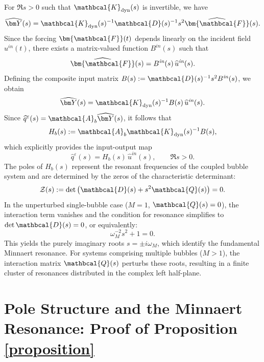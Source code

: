 \documentclass[11pt,a4paper]{article}
\numberwithin{equation}{section}
\begin{document}
For $\Re s > 0$ such that $\mathbcal{K}_{\mathrm{dyn}}(s)$ is invertible, we have
\[
\widehat{\bm Y}(s) = \mathbcal{K}_{\mathrm{dyn}}(s)^{-1}\mathbcal{D}(s)^{-1}s^2 \widehat{\bm{\mathbcal{F}}}(s).
\]
Since the forcing $\bm{\mathbcal{F}}(t)$ depends linearly on the incident field $u^{\textit{in}}(t)$, there exists a matrix-valued function $B^{\textit{in}}(s)$ such that
\[
\widehat{\bm{\mathbcal{F}}}(s) = B^{\textit{in}}(s)\,\widehat u^{\textit{in}}(s).
\]
Defining the composite input matrix $B(s) := \mathbcal{D}(s)^{-1}s^2 B^{\textit{in}}(s)$, we obtain
\[
\widehat{\bm Y}(s) = \mathbcal{K}_{\mathrm{dyn}}(s)^{-1} B(s)\,\widehat u^{\textit{in}}(s).
\]
Since $\widehat{q}^\varepsilon(s) = \mathbcal{A}_b \widehat{\bm Y}(s)$, it follows that
\[
H_b(s) := \mathbcal{A}_b \mathbcal{K}_{\mathrm{dyn}}(s)^{-1} B(s),
\]
which explicitly provides the input-output map
\[
\widehat q^\varepsilon(s) = H_b(s)\,\widehat u^{\textit{in}}(s), \qquad \Re s > 0.
\]
The poles of $H_b(s)$ represent the resonant frequencies of the coupled bubble system and are determined by the zeros of the characteristic determinant:
\begin{equation}
    \mathcal{Z}(s) := \det\left( \mathbcal{D}(s) + s^2 \mathbcal{Q}(s) \right) = 0.
\end{equation}
In the unperturbed single-bubble case ($M=1$, $\mathbcal{Q}(s)=0$), the interaction term vanishes and the condition for resonance simplifies to $\det \mathbcal{D}(s)=0$, or equivalently:
\begin{equation}
    \omega_M^{-2} s^2 + 1 = 0.
\end{equation}
This yields the purely imaginary roots $s = \pm i\omega_M$, which identify the fundamental Minnaert resonance. For systems comprising multiple bubbles ($M>1$), the interaction matrix $\mathbcal{Q}(s)$ perturbs these roots, resulting in a finite cluster of resonances distributed in the complex left half-plane.


\section{Pole Structure and the Minnaert Resonance: Proof of Proposition \ref{proposition}}\label{proofprop}
\end{document}
